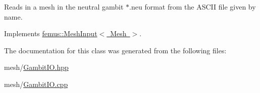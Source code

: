Reads in a mesh in the neutral gambit $\ast$.neu format from the A\+S\+C\+II file given by name. 

Implements \mbox{\hyperlink{classfemus_1_1_mesh_input_abf3b91c5ef2cdcf99561ab7429101601}{femus\+::\+Mesh\+Input$<$ Mesh $>$}}.



The documentation for this class was generated from the following files\+:\begin{DoxyCompactItemize}
\item 
mesh/\mbox{\hyperlink{_gambit_i_o_8hpp}{Gambit\+I\+O.\+hpp}}\item 
mesh/\mbox{\hyperlink{_gambit_i_o_8cpp}{Gambit\+I\+O.\+cpp}}\end{DoxyCompactItemize}
